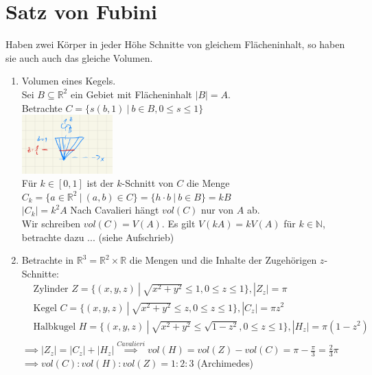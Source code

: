 \chapter{Satz von Fubini}
  \begin{remark}
    Haben zwei Körper in jeder Höhe Schnitte von gleichem Flächeninhalt, so haben sie auch auch das gleiche Volumen.    
  \end{remark}

  \begin{example}
    \begin{enumerate}
      \item Volumen eines Kegels.\\
        Sei $B \subseteq \mathbb{R}^2$ ein Gebiet mit Flächeninhalt $|B| = A$.\\
        Betrachte $C = \{s(b,1) \ | \ b \in B, 0 \leq s \leq 1\}$\\
        \includegraphics[width=3.5cm]{img/VI_Bsp_1_Kegel.png}\\
        Für $k \in [0,1]$ ist der $k$-Schnitt von $C$ die Menge \\
        $C_k = \{a \in \mathbb{R}^2 \ | \ (a,b) \in C\} = \{h \cdot b \ | \ b \in B\} = kB$\\
        $|C_k| = k^2A$ Nach Cavalieri hängt $vol(C)$ nur von $A$ ab.\\
        Wir schreiben $vol(C) = V(A)$. Es gilt $V(kA) = kV(A)$ für $k \in \mathbb{N}$, betrachte dazu ... (siehe Aufschrieb)
        \item Betrachte in $\mathbb{R}^3 = \mathbb{R}^2 \times \mathbb{R}$ die Mengen und die Inhalte der Zugehörigen $z$-Schnitte:
        \begin{align*}
          &\text{Zylinder } Z=\{(x,y,z) \ | \ \sqrt{x^2 + y^2} \leq 1, 0 \leq z \leq 1\}, |Z_z| = \pi\\
          &\text{Kegel } C=\{(x,y,z) \ | \ \sqrt{x^2 + y^2} \leq z, 0 \leq z \leq 1\}, |C_z| = \pi z^2\\
          &\text{Halbkugel } H=\{(x,y,z) \ | \ \sqrt{x^2 + y^2} \leq \sqrt{1-z^2}, 0 \leq z \leq 1\}, |H_z| = \pi (1-z^2)\\
        \end{align*}
        $\implies |Z_z| = |C_z| + |H_z| \stackrel{Cavalieri}{\implies} vol(H) = vol(Z) - vol(C) = \pi - \frac{\pi}{3} = \frac{2}{3} \pi$\\
        $\implies vol(C) : vol(H) : vol(Z) = 1 : 2 : 3$ (Archimedes)
    \end{enumerate}
  \end{example}

